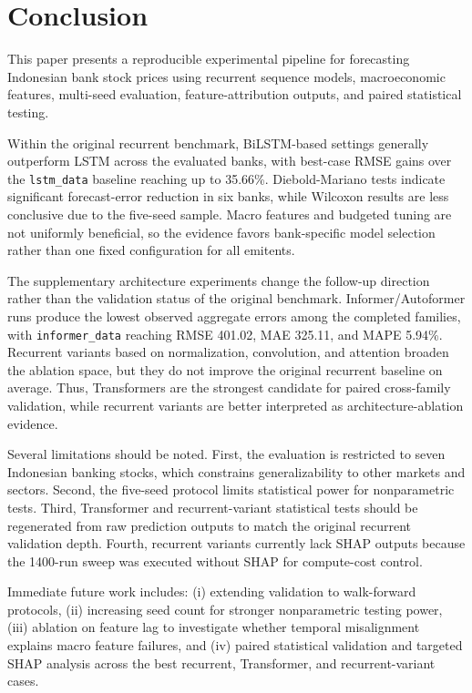 \section{Conclusion}
This paper presents a reproducible experimental pipeline for forecasting Indonesian bank stock prices using recurrent sequence models, macroeconomic features, multi-seed evaluation, feature-attribution outputs, and paired statistical testing.

Within the original recurrent benchmark, BiLSTM-based settings generally outperform LSTM across the evaluated banks, with best-case RMSE gains over the \texttt{lstm\_data} baseline reaching up to 35.66\%. Diebold-Mariano tests indicate significant forecast-error reduction in six banks, while Wilcoxon results are less conclusive due to the five-seed sample. Macro features and budgeted tuning are not uniformly beneficial, so the evidence favors bank-specific model selection rather than one fixed configuration for all emitents.

The supplementary architecture experiments change the follow-up direction rather than the validation status of the original benchmark. Informer/Autoformer runs produce the lowest observed aggregate errors among the completed families, with \texttt{informer\_data} reaching RMSE 401.02, MAE 325.11, and MAPE 5.94\%. Recurrent variants based on normalization, convolution, and attention broaden the ablation space, but they do not improve the original recurrent baseline on average. Thus, Transformers are the strongest candidate for paired cross-family validation, while recurrent variants are better interpreted as architecture-ablation evidence.

Several limitations should be noted. First, the evaluation is restricted to seven Indonesian banking stocks, which constrains generalizability to other markets and sectors. Second, the five-seed protocol limits statistical power for nonparametric tests. Third, Transformer and recurrent-variant statistical tests should be regenerated from raw prediction outputs to match the original recurrent validation depth. Fourth, recurrent variants currently lack SHAP outputs because the 1400-run sweep was executed without SHAP for compute-cost control.

Immediate future work includes: (i) extending validation to walk-forward protocols, (ii) increasing seed count for stronger nonparametric testing power, (iii) ablation on feature lag to investigate whether temporal misalignment explains macro feature failures, and (iv) paired statistical validation and targeted SHAP analysis across the best recurrent, Transformer, and recurrent-variant cases.
